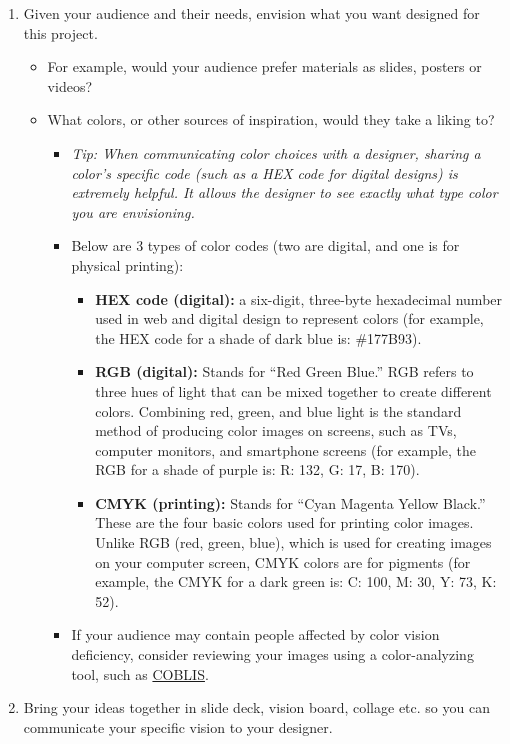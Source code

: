 \documentclass[
]{book}
\providecommand{\tightlist}{%
  \setlength{\itemsep}{0pt}\setlength{\parskip}{0pt}}
\begin{document}
\begin{enumerate}
\def\labelenumi{\arabic{enumi}.}
\tightlist
\item
  Given your audience and their needs, envision what you want designed for this project.

  \begin{itemize}
  \tightlist
  \item
    For example, would your audience prefer materials as slides, posters or videos?
  \item
    What colors, or other sources of inspiration, would they take a liking to?

    \begin{itemize}
    \tightlist
    \item
      \emph{Tip: When communicating color choices with a designer, sharing a color's specific code (such as a HEX code for digital designs) is extremely helpful. It allows the designer to see exactly what type color you are envisioning. }
    \item
      Below are 3 types of color codes (two are digital, and one is for physical printing):

      \begin{itemize}
      \tightlist
      \item
        \textbf{HEX code (digital):} a six-digit, three-byte hexadecimal number used in web and digital design to represent colors (for example, the HEX code for a shade of dark blue is: \#177B93).
      \item
        \textbf{RGB (digital):} Stands for ``Red Green Blue.'' RGB refers to three hues of light that can be mixed together to create different colors. Combining red, green, and blue light is the standard method of producing color images on screens, such as TVs, computer monitors, and smartphone screens (for example, the RGB for a shade of purple is: R: 132, G: 17, B: 170).
      \item
        \textbf{CMYK (printing):} Stands for ``Cyan Magenta Yellow Black.'' These are the four basic colors used for printing color images. Unlike RGB (red, green, blue), which is used for creating images on your computer screen, CMYK colors are for pigments (for example, the CMYK for a dark green is: C: 100, M: 30, Y: 73, K: 52).
      \end{itemize}
    \item
      If your audience may contain people affected by color vision deficiency, consider reviewing your images using a color-analyzing tool, such as \href{https://www.color-blindness.com/coblis-color-blindness-simulator/}{COBLIS}.
    \end{itemize}
  \end{itemize}
\item
  Bring your ideas together in slide deck, vision board, collage etc. so you can communicate your specific vision to your designer.
\end{enumerate}
\end{document}
